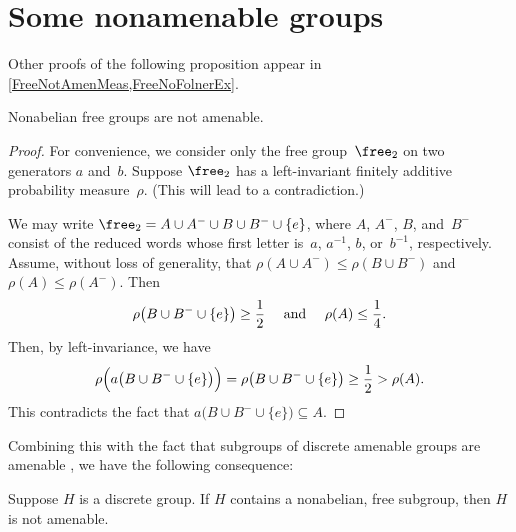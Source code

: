 \section{Some nonamenable groups} \label{NonamenSect}

Other proofs of the following proposition appear in \cref{FreeNotAmenMeas,FreeNoFolnerEx}.

\begin{prop} \label{FreeNotAmen}
Nonabelian free groups are not amenable.
\end{prop}

\begin{proof}
For convenience, we consider only the free group~$\free_2$ on two generators $a$ and~$b$. Suppose $\free_2$ has a left-invariant finitely additive probability measure~$\rho$. (This will lead to a contradiction.)

We may write $\free_2 = A \cup A^- \cup B \cup B^- \cup \{e\}$, where $A$, $A^-$, $B$, and~$B^-$ consist of the reduced words whose first letter is~$a$, $a^{-1}$, $b$, or~$b^{-1}$, respectively. Assume, without loss of generality, that $\rho(A \cup A^-) \le \rho(B \cup B^-)$ and $\rho(A) \le \rho(A^-)$. Then
	$$ \text{$\displaystyle \rho \bigl( B \cup B^- \cup \{e\} \bigr) \ge \frac{1}{2}$
	\quad
	and
	\quad
	$\displaystyle \rho(A) \le \frac{1}{4}$}
	.$$
Then, by left-invariance, we have
	$$ \rho \Bigl( a \bigl( B \cup B^- \cup \{e\} \bigr) \Bigr)
	= \rho \bigl( B \cup B^- \cup \{e\} \bigr)
	\ge \frac{1}{2}
	>  \rho(A) .$$
This contradicts the fact that $a \bigl( B \cup B^- \cup \{e\} \bigr) \subseteq A$.
\end{proof}

Combining this with the fact that subgroups of discrete amenable groups are amenable , we have the following consequence:

\begin{cor} \label{FreeSubgrp->Nonamen}
Suppose $H$ is a discrete group. 
If $H$ contains a nonabelian, free subgroup, then $H$ is not amenable.
\end{cor}

